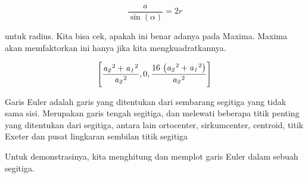 \documentclass[12pt,arial,letterpaper]{book}
\begin{document}
\begin{eulercomment}
\begin{eulercomment}
\begin{eulercomment}
\begin{eulercomment}
\begin{eulercomment}
\begin{eulercomment}
\begin{eulercomment}
\begin{eulercomment}
\begin{eulercomment}
\begin{eulercomment}
\begin{eulercomment}
\begin{eulercomment}
\begin{eulercomment}
\begin{eulercomment}
\begin{eulercomment}
\begin{eulercomment}
\begin{eulercomment}
\begin{eulercomment}
\begin{eulercomment}
\begin{eulercomment}
\begin{eulercomment}
\begin{eulercomment}
\begin{eulercomment}
\begin{eulercomment}
\begin{eulercomment}
\begin{eulercomment}
\begin{eulercomment}
\end{eulercomment}
\begin{eulerformula}
\[
\frac{a}{\sin(\alpha)}=2r
\]
\end{eulerformula}
\begin{eulercomment}
untuk radius.  Kita bisa cek, apakah ini benar adanya pada Maxima.
Maxima akan memfaktorkan ini hanya jika kita mengkuadratkannya.
\end{eulercomment}
\begin{eulerformula}
\[
\left[ \frac{{\it a_2}^2+{\it a_1}^2}{{\it a_2}^2} , 0 , \frac{16\,  \left({\it a_2}^2+{\it a_1}^2\right)}{{\it a_2}^2} \right] 
\]
\end{eulerformula}
\begin{eulercomment}
Garis Euler adalah garis yang ditentukan dari sembarang segitiga yang
tidak sama sisi. Merupakan garis tengah segitiga, dan melewati
beberapa titik penting yang ditentukan dari segitiga, antara lain
ortocenter, sirkumcenter, centroid, titik Exeter dan pusat lingkaran
sembilan titik segitiga

Untuk demonstrasinya, kita menghitung dan memplot garis Euler dalam
sebuah segitiga.


\end{eulercomment}
\end{eulercomment}
\end{eulercomment}
\end{eulercomment}
\end{eulercomment}
\end{eulercomment}
\end{eulercomment}
\end{eulercomment}
\end{eulercomment}
\end{eulercomment}
\end{eulercomment}
\end{eulercomment}
\end{eulercomment}
\end{eulercomment}
\end{eulercomment}
\end{eulercomment}
\end{eulercomment}
\end{eulercomment}
\end{eulercomment}
\end{eulercomment}
\end{eulercomment}
\end{eulercomment}
\end{eulercomment}
\end{eulercomment}
\end{eulercomment}
\end{eulercomment}
\end{eulercomment}
\end{document}

